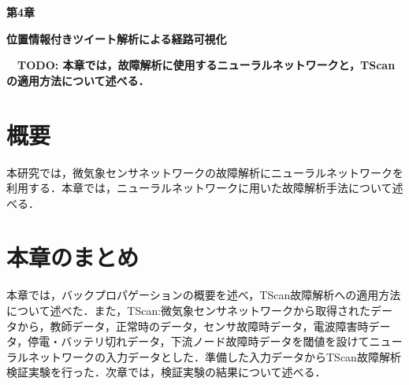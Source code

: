 \newpage
\setcounter{chapter}{4}
\setcounter{section}{0}

\begin{center}
\vspace{0.5cm}
\huge{\bf 第4章}
\par
\vspace{1cm}
\hrulefill
\par
\vspace{1cm}
\huge{\bf 位置情報付きツイート解析による経路可視化}
\par
\vspace{0.5cm}
\hrulefill
\vspace{1cm}
\par

\begin{flushleft}
\large{{\bf　TODO: 本章では，故障解析に使用するニューラルネットワークと，TScanの適用方法について述べる．}}
\end{flushleft}
\end{center}


\newpage
\section{概要}
本研究では，微気象センサネットワークの故障解析にニューラルネットワークを利用する．本章では，ニューラルネットワークに用いた故障解析手法について述べる．

\newpage

\section{本章のまとめ}
本章では，バックプロパゲーションの概要を述べ，TScan故障解析への適用方法について述べた．また，TScan:微気象センサネットワークから取得されたデータから，教師データ，正常時のデータ，センサ故障時データ，電波障害時データ，停電・バッテリ切れデータ，下流ノード故障時データを閾値を設けてニューラルネットワークの入力データとした．準備した入力データからTScan故障解析検証実験を行った．次章では，検証実験の結果について述べる．
\newpage
